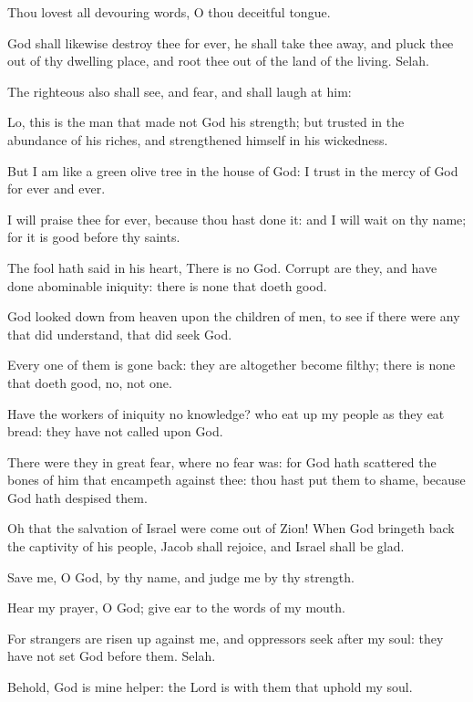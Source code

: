 \Verse Thou lovest all devouring words, O thou deceitful tongue.

\Verse God shall likewise destroy thee for ever, he shall take thee away, and pluck thee out of thy dwelling place, and root thee out of the land of the living. Selah.

\Verse The righteous also shall see, and fear, and shall laugh at him:

\Verse Lo, this is the man that made not God his strength; but trusted in the abundance of his riches, and strengthened himself in his wickedness.

\Verse But I am like a green olive tree in the house of God: I trust in the mercy of God for ever and ever.

\Verse I will praise thee for ever, because thou hast done it: and I will wait on thy name; for it is good before thy saints.




\Chapter
\Verse The fool hath said in his heart, There is no God. Corrupt are they, and have done abominable iniquity: there is none that doeth good.

\Verse God looked down from heaven upon the children of men, to see if there were any that did understand, that did seek God.

\Verse Every one of them is gone back: they are altogether become filthy; there is none that doeth good, no, not one.

\Verse Have the workers of iniquity no knowledge? who eat up my people as they eat bread: they have not called upon God.

\Verse There were they in great fear, where no fear was: for God hath scattered the bones of him that encampeth against thee: thou hast put them to shame, because God hath despised them.

\Verse Oh that the salvation of Israel were come out of Zion! When God bringeth back the captivity of his people, Jacob shall rejoice, and Israel shall be glad.




\Chapter
\Verse Save me, O God, by thy name, and judge me by thy strength.

\Verse Hear my prayer, O God; give ear to the words of my mouth.

\Verse For strangers are risen up against me, and oppressors seek after my soul: they have not set God before them. Selah.

\Verse Behold, God is mine helper: the Lord is with them that uphold my soul.

